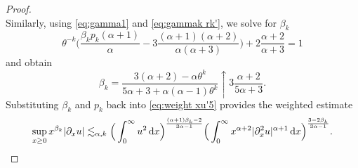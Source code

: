 \documentclass[reqno,12pt]{amsart}
\renewcommand{\d}{\ensuremath{\mathrm{d}}}
\renewcommand{\d}{\ensuremath{{\rm d}}}
\numberwithin{equation}{section}
\begin{document}
\begin{proof}
\begin{equation*}
\end{equation*}
%
Similarly, using \eqref{eq:gamma1} and \eqref{eq:gammak rk'}, we solve for $\beta_k$
\begin{equation*}
\theta^{-k} \Big(\frac{\beta_k p_k (\alpha+1)}{\alpha} - 3 \frac{(\alpha+1)(\alpha+2)}{\alpha (\alpha+3)} \Big) + 2 \frac{\alpha+2}{\alpha+3} = 1
 \end{equation*}
%
and obtain
%
\begin{equation}\label{eq:betak_dxu}
\beta_k = \frac{3(\alpha+2) - \alpha \theta^k}{5\alpha+3+\alpha (\alpha-1)\theta^k} \uparrow 3 \frac{\alpha +2}{5\alpha+3} .
\end{equation}
%
Substituting $\beta_k$ and $p_k$ back into \eqref{eq:weight xu'5} provides the weighted estimate
%
\begin{equation}\label{eq:weight xu'6}
\sup_{x \ge 0} x^{\beta_k} |\partial_x u| 
\lesssim_{\alpha,k} \Big(\int_0^\infty  u^2 \, \d x \Big)^{\frac{(\alpha+1)\beta_k-2}{3\alpha-1}}  \Big( \int_0^\infty x^{\alpha+2}|\partial_x^2 u|^{\alpha+1} \, \d x \Big)^{\frac{3-2\beta_k}{3\alpha-1}}.
\end{equation}
%

%
\bigskip
%


\end{proof}
\end{document}
